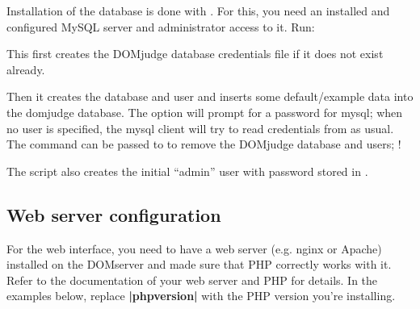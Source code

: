 \documentclass[a4paper,10pt,english,openany]{sphinxmanual}
\begin{document}
\sphinxAtStartPar
Installation of the database is done with .
For this, you need an installed and configured MySQL server and
administrator access to it. Run:

\begin{sphinxVerbatim}[commandchars=\\\{\}]
 
 \PYG{p}{[}   \PYG{p}{]} \PYG{p}{[} \PYG{p}{]} 
\end{sphinxVerbatim}

\sphinxAtStartPar
This first creates the DOMjudge database credentials file
 if it does not exist already.

\sphinxAtStartPar
Then it creates the database and user and inserts some
default/example data into the domjudge database. The option
 will prompt for a password for mysql; when no user is
specified, the mysql client will try to read
credentials from  as usual. The command
 can be passed to  to
remove the DOMjudge database and users; !

\sphinxAtStartPar
The script also creates the initial “admin” user with password
stored in .


\subsection{Web server configuration}
\label{\detokenize{install-domserver:web-server-configuration}}
\sphinxAtStartPar
For the web interface, you need to have a web server (e.g. nginx or Apache)
installed on the DOMserver and made sure that PHP correctly works
with it. Refer to the documentation of your web server and PHP for
details. In the examples below, replace {\color{red}\bfseries{}|phpversion|} with the PHP version
you’re installing.
\end{document}
